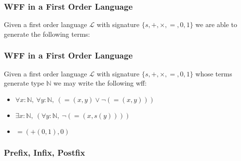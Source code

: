 \documentclass{beamer}
\theoremstyle{indentDefn} \newtheorem{defn}[]{Definition}
\begin{document}
\begin{frame}
	\frametitle{WFF in a First Order Language}
	
	Given a first order language $\mathcal{L}$ with signature $\{s,+,\times,=,0,1\}$ we are able to generate the following terms:
	
	\vspace{5cm}

		
\end{frame}

\begin{frame}
	\frametitle{WFF in a First Order Language}
	
	Given a first order language $\mathcal{L}$ with signature $\{s,+,\times,=,0,1\}$ whose terms generate type $\mathbb{N}$ we may write the following wff:
	
	\begin{itemize}
		\item  $\forall x : \mathbb{N}, \ \forall y : \mathbb{N}, \ (=(x,y) \lor \lnot(=(x,y)))$
		\item  $\exists x : \mathbb{N}, \ (\forall y : \mathbb{N}, \ \lnot(=(x,s(y))))$
		\item $=(+(0,1),0)$
	\end{itemize}
	
	\vspace{4cm}
\end{frame}

\begin{frame}
	\frametitle{Prefix, Infix, Postfix}
\end{frame}
\end{document}
